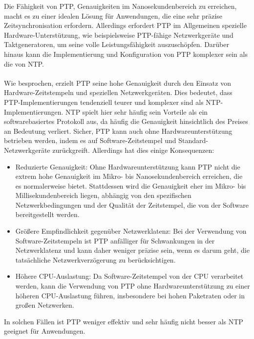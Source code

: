 \documentclass[../vs-script-first-v01.tex]{subfiles}
\begin{document}
Die Fähigkeit von PTP, Genauigkeiten im Nanosekundenbereich zu erreichen, macht es zu einer idealen Lösung für Anwendungen, die eine sehr präzise Zeitsynchronisation erfordern. Allerdings erfordert PTP im Allgemeinen spezielle Hardware-Unterstützung, wie beispielsweise PTP-fähige Netzwerkgeräte und Taktgeneratoren, um seine volle Leistungsfähigkeit auszuschöpfen. Darüber hinaus kann die Implementierung und Konfiguration von PTP komplexer sein als die von NTP.
\\\\
Wie besprochen, erzielt PTP seine hohe Genauigkeit durch den Einsatz von Hardware-Zeitstempeln und speziellen Netzwerkgeräten. Dies bedeutet, dass PTP-Implementierungen tendenziell teurer und komplexer sind als NTP-Implementierungen. NTP spielt hier sehr häufig sein Vorteile als ein softwarebasiertes Protokoll aus, da häufig die Genauigkeit hinsichtlich des Preises an Bedeutung verliert.
Sicher, PTP kann auch ohne Hardwareunterstützung betrieben werden, indem es auf Software-Zeitstempel und Standard-Netzwerkgeräte zurückgreift. Allerdings hat dies einige Konsequenzen:
\begin{itemize}
\item Reduzierte Genauigkeit: Ohne Hardwareunterstützung kann PTP nicht die extrem hohe Genauigkeit im Mikro- bis Nanosekundenbereich erreichen, die es normalerweise bietet. Stattdessen wird die Genauigkeit eher im Mikro- bis Millisekundenbereich liegen, abhängig von den spezifischen Netzwerkbedingungen und der Qualität der Zeitstempel, die von der Software bereitgestellt werden.
\item Größere Empfindlichkeit gegenüber Netzwerklatenz: Bei der Verwendung von Software-Zeitstempeln ist PTP anfälliger für Schwankungen in der Netzwerklatenz und kann daher weniger präzise sein, wenn es darum geht, die tatsächliche Netzwerkverzögerung zu berücksichtigen.
\item Höhere CPU-Auslastung: Da Software-Zeitstempel von der CPU verarbeitet werden, kann die Verwendung von PTP ohne Hardwareunterstützung zu einer höheren CPU-Auslastung führen, insbesondere bei hohen Paketraten oder in großen Netzwerken.
\end{itemize}
In solchen Fällen ist PTP weniger effektiv und sehr häufig nicht besser als NTP geeignet für Anwendungen.
\end{document}
